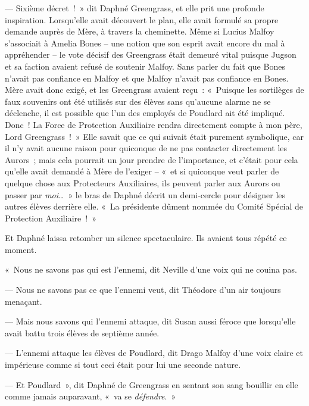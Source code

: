 --- Sixième décret~!~» dit Daphné Greengrass, et elle prit une profonde inspiration. Lorsqu'elle avait découvert le plan, elle avait formulé sa propre demande auprès de Mère, à travers la cheminette. Même si Lucius Malfoy s'associait à Amelia Bones -- une notion que son esprit avait encore du mal à appréhender -- le vote décisif des Greengrass était demeuré vital puisque Jugson et sa faction avaient refusé de soutenir Malfoy. Sans parler du fait que Bones n'avait pas confiance en Malfoy et que Malfoy n'avait pas confiance en Bones. Mère avait donc exigé, et les Greengrass avaient reçu~: «~Puisque les sortilèges de faux souvenirs ont été utilisés sur des élèves sans qu'aucune alarme ne se déclenche, il est possible que l'un des employés de Poudlard ait été impliqué. Donc~! La Force de Protection Auxiliaire rendra directement compte à mon père, Lord Greengrass~!~» Elle savait que ce qui suivait était purement symbolique, car il n'y avait aucune raison pour quiconque de ne pas contacter directement les Aurors~; mais cela pourrait un jour prendre de l'importance, et c'était pour cela qu'elle avait demandé à Mère de l'exiger -- «~et si quiconque veut parler de quelque chose aux Protecteurs Auxiliaires, ils peuvent parler aux Aurors ou passer par \emph{moi}…~» le bras de Daphné décrit un demi-cercle pour désigner les autres élèves derrière elle. «~La présidente dûment nommée du Comité Spécial de Protection Auxiliaire~!~»

Et Daphné laissa retomber un silence spectaculaire. Ils avaient tous répété ce moment.

«~Nous ne savons pas qui est l'ennemi, dit Neville d'une voix qui ne couina pas.

--- Nous ne savons pas ce que l'ennemi veut, dit Théodore d'un air toujours menaçant.

--- Mais nous savons qui l'ennemi attaque, dit Susan aussi féroce que lorsqu'elle avait battu trois élèves de septième année.

--- L'ennemi attaque les élèves de Poudlard, dit Drago Malfoy d'une voix claire et impérieuse comme si tout ceci était pour lui une seconde nature.

--- Et Poudlard~», dit Daphné de Greengrass en sentant son sang bouillir en elle comme jamais auparavant, «~va se \emph{défendre}.~»
